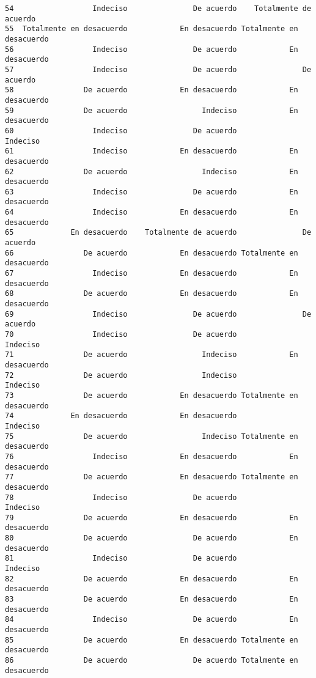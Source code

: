 \documentclass[
  letterpaper,
  DIV=11,
  numbers=noendperiod]{scrartcl}
\begin{document}
\begin{verbatim}
54                  Indeciso               De acuerdo    Totalmente de acuerdo
55  Totalmente en desacuerdo            En desacuerdo Totalmente en desacuerdo
56                  Indeciso               De acuerdo            En desacuerdo
57                  Indeciso               De acuerdo               De acuerdo
58                De acuerdo            En desacuerdo            En desacuerdo
59                De acuerdo                 Indeciso            En desacuerdo
60                  Indeciso               De acuerdo                 Indeciso
61                  Indeciso            En desacuerdo            En desacuerdo
62                De acuerdo                 Indeciso            En desacuerdo
63                  Indeciso               De acuerdo            En desacuerdo
64                  Indeciso            En desacuerdo            En desacuerdo
65             En desacuerdo    Totalmente de acuerdo               De acuerdo
66                De acuerdo            En desacuerdo Totalmente en desacuerdo
67                  Indeciso            En desacuerdo            En desacuerdo
68                De acuerdo            En desacuerdo            En desacuerdo
69                  Indeciso               De acuerdo               De acuerdo
70                  Indeciso               De acuerdo                 Indeciso
71                De acuerdo                 Indeciso            En desacuerdo
72                De acuerdo                 Indeciso                 Indeciso
73                De acuerdo            En desacuerdo Totalmente en desacuerdo
74             En desacuerdo            En desacuerdo                 Indeciso
75                De acuerdo                 Indeciso Totalmente en desacuerdo
76                  Indeciso            En desacuerdo            En desacuerdo
77                De acuerdo            En desacuerdo Totalmente en desacuerdo
78                  Indeciso               De acuerdo                 Indeciso
79                De acuerdo            En desacuerdo            En desacuerdo
80                De acuerdo               De acuerdo            En desacuerdo
81                  Indeciso               De acuerdo                 Indeciso
82                De acuerdo            En desacuerdo            En desacuerdo
83                De acuerdo            En desacuerdo            En desacuerdo
84                  Indeciso               De acuerdo            En desacuerdo
85                De acuerdo            En desacuerdo Totalmente en desacuerdo
86                De acuerdo               De acuerdo Totalmente en desacuerdo

\end{verbatim}
\end{document}
